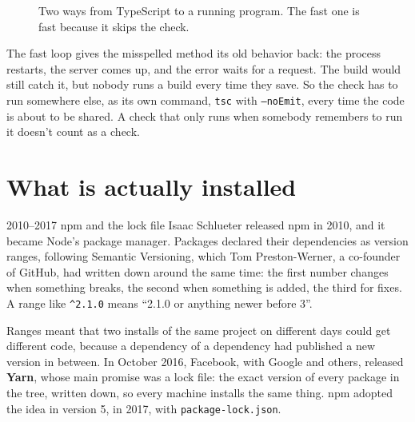 \begin{figure}[htbp]
\centering
{}
\caption{Two ways from TypeScript to a running program. The fast one is fast
because it skips the check.}
\end{figure}

The fast loop gives the misspelled method its old behavior back: the process
restarts, the server comes up, and the error waits for a request. The build
would still catch it, but nobody runs a build every time they save. So the
check has to run somewhere else, as its own command, \texttt{tsc} with
\texttt{--noEmit}, every time the code is about to be shared. A check that
only runs when somebody remembers to run it doesn't count as a check.

\section{What is actually installed}

\begin{history}{2010--2017 \textperiodcentered{} npm and the lock file}
Isaac Schlueter released npm in 2010, and it became Node's package manager.
Packages declared their dependencies as version ranges, following Semantic
Versioning, which Tom Preston-Werner, a co-founder of GitHub, had written down
around the same time: the first number changes when something breaks, the
second when something is added, the third for fixes. A range like
\texttt{\textasciicircum 2.1.0} means ``2.1.0 or anything newer before 3''.

Ranges meant that two installs of the same project on different days could get
different code, because a dependency of a dependency had published a new
version in between. In October 2016, Facebook, with Google and others, released
\textbf{Yarn}, whose main promise was a lock file: the exact version of every
package in the tree, written down, so every machine installs the same thing.
npm adopted the idea in version 5, in 2017, with \texttt{package-lock.json}.
\end{history}

